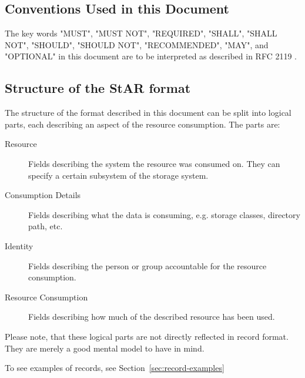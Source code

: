 \subsection{Conventions Used in this Document}
The key words "MUST", "MUST NOT", "REQUIRED", "SHALL", "SHALL NOT", 
"SHOULD", "SHOULD NOT", "RECOMMENDED",  "MAY", and 
"OPTIONAL" in this document are to be interpreted as described in
RFC 2119 \cite{rfc2119}.


\subsection{Structure of the StAR format}

The structure of the format described in this document can be split into
logical parts, each describing an aspect of the resource consumption. 
The parts are:

\begin{description}

\item[Resource] Fields describing the system the resource was consumed on. They 
can specify a certain subsystem of the storage system.

\item[Consumption Details] Fields describing what the data is consuming, e.g. 
storage classes, directory path, etc.

\item[Identity] Fields describing the person or group accountable for the
resource consumption.

\item[Resource Consumption] Fields describing how much of the described
resource has been used.

\end{description}

Please note, that these logical parts are not directly reflected in record 
format. They are merely a good mental model to have in mind.

To see examples of records, see Section~\ref{sec:record-examples}

